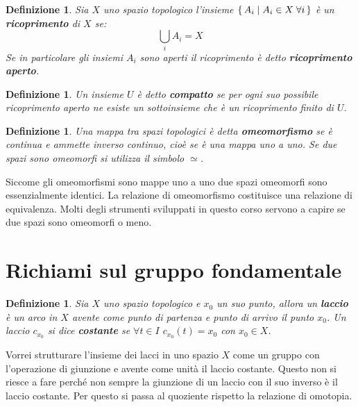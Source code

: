 \documentclass[10pt, twoside=false, x11names]{scrbook}
\newtheorem{definition}[theorem]{Definizione}
\begin{document}
\begin{definition}
  Sia $ X $ uno spazio topologico l'insieme $ \set{A_i | A_i \in X \; \forall i} $ è un \textbf{ricoprimento}
  di $ X $ se:
  \[
    \bigcup_{i} A_i = X
  \]
  Se in particolare gli insiemi $ A_i $ sono aperti il ricoprimento è detto \textbf{ricoprimento aperto}.
\end{definition}

\begin{definition}
  Un insieme $ U $ è detto \textbf{compatto} se per ogni suo possibile ricoprimento
  aperto ne esiste un sottoinsieme che è un ricoprimento \emph{finito} di $ U $.
\end{definition}

\begin{definition}
  Una mappa tra spazi topologici è detta \textbf{omeomorfismo} se è continua
  e ammette inverso continuo, cioè se è una mappa uno a uno. Se due spazi sono omeomorfi si utilizza
  il simbolo $ \simeq $.
\end{definition}
Siccome gli omeomorfismi sono mappe uno a uno due spazi omeomorfi sono essenzialmente identici. La
relazione di omeomorfismo costituisce una relazione di equivalenza. Molti
degli strumenti sviluppati in questo corso servono a capire se due spazi sono omeomorfi o meno.



\section{Richiami sul gruppo fondamentale}

\begin{definition}
  Sia $ X $ uno spazio topologico e $ x_0 $ un suo punto, allora un \textbf{laccio} è un arco in $ X $
  avente come punto di partenza e punto di arrivo il punto $ x_0 $. Un laccio $ c_{x_0} $ si dice \textbf{costante} se $ \forall t \in I $
  $ c_{x_0}(t) = x_0 $ con $ x_0 \in X $.
\end{definition}

Vorrei strutturare l'insieme dei lacci in uno spazio $ X $ come un gruppo con l'operazione di giunzione
e avente come unità il laccio costante. Questo non si riesce a fare perché non sempre
la giunzione di un laccio con il suo inverso è il laccio costante. Per questo si passa al quoziente
rispetto la relazione di omotopia.
\end{document}
